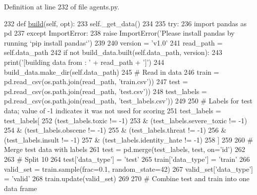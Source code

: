 Definition at line 232 of file agents.\+py.


\begin{DoxyCode}
232     \textcolor{keyword}{def }\hyperlink{namespaceparlai_1_1mturk_1_1tasks_1_1talkthewalk_1_1download_a8c0fbb9b6dfe127cb8c1bd6e7c4e33fd}{build}(self, opt):
233         self.\_get\_data()
234 
235         \textcolor{keywordflow}{try}:
236             \textcolor{keyword}{import} pandas \textcolor{keyword}{as} pd
237         \textcolor{keywordflow}{except} ImportError:
238             \textcolor{keywordflow}{raise} ImportError(\textcolor{stringliteral}{'Please install pandas by running `pip install pandas`'})
239 
240         version = \textcolor{stringliteral}{'v1.0'}
241         read\_path = self.data\_path
242         \textcolor{keywordflow}{if} \textcolor{keywordflow}{not} build\_data.built(self.data\_path, version):
243             print(\textcolor{stringliteral}{'[building data from : '} + read\_path + \textcolor{stringliteral}{']'})
244             build\_data.make\_dir(self.data\_path)
245             \textcolor{comment}{# Read in data}
246             train = pd.read\_csv(os.path.join(read\_path, \textcolor{stringliteral}{'train.csv'}))
247             test = pd.read\_csv(os.path.join(read\_path, \textcolor{stringliteral}{'test.csv'}))
248             test\_labels = pd.read\_csv(os.path.join(read\_path, \textcolor{stringliteral}{'test\_labels.csv'}))
249 
250             \textcolor{comment}{# Labels for test data; value of -1 indicates it was not used for scoring}
251             test\_labels = test\_labels[
252                 (test\_labels.toxic != -1)
253                 & (test\_labels.severe\_toxic != -1)
254                 & (test\_labels.obscene != -1)
255                 & (test\_labels.threat != -1)
256                 & (test\_labels.insult != -1)
257                 & (test\_labels.identity\_hate != -1)
258             ]
259 
260             \textcolor{comment}{# Merge test data with labels}
261             test = pd.merge(test\_labels, test, on=\textcolor{stringliteral}{'id'})
262 
263             \textcolor{comment}{# Split 10%
264             test[\textcolor{stringliteral}{'data\_type'}] = \textcolor{stringliteral}{'test'}
265             train[\textcolor{stringliteral}{'data\_type'}] = \textcolor{stringliteral}{'train'}
266             valid\_set = train.sample(frac=0.1, random\_state=42)
267             valid\_set[\textcolor{stringliteral}{'data\_type'}] = \textcolor{stringliteral}{'valid'}
268             train.update(valid\_set)
269 
270             \textcolor{comment}{# Combine test and train into one data frame}
}
\end{DoxyCode}
